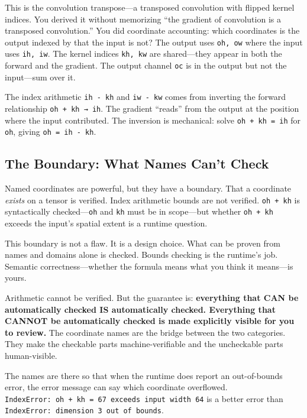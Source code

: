 \documentclass[11pt,titlepage]{article}
\begin{document}
This is the convolution transpose---a transposed convolution with
flipped kernel indices. You derived it without memorizing ``the gradient
of convolution is a transposed convolution.'' You did coordinate
accounting: which coordinates is the output indexed by that the input is
not? The output uses \texttt{oh,\ ow} where the input uses
\texttt{ih,\ iw}. The kernel indices \texttt{kh,\ kw} are shared---they
appear in both the forward and the gradient. The output channel
\texttt{oc} is in the output but not the input---sum over it.

The index arithmetic \texttt{ih\ -\ kh} and \texttt{iw\ -\ kw} comes
from inverting the forward relationship \texttt{oh\ +\ kh\ →\ ih}. The
gradient ``reads'' from the output at the position where the input
contributed. The inversion is mechanical: solve
\texttt{oh\ +\ kh\ =\ ih} for \texttt{oh}, giving
\texttt{oh\ =\ ih\ -\ kh}.

\vspace{2em}

\hypertarget{the-boundary-what-names-cant-check}{%
\subsection{The Boundary: What Names Can't
Check}\label{the-boundary-what-names-cant-check}}

Named coordinates are powerful, but they have a boundary. That a
coordinate \emph{exists} on a tensor is verified. Index arithmetic
bounds are not verified. \texttt{oh\ +\ kh} is syntactically
checked---\texttt{oh} and \texttt{kh} must be in scope---but whether
\texttt{oh\ +\ kh} exceeds the input's spatial extent is a runtime
question.

This boundary is not a flaw. It is a design choice. What can be proven
from names and domains alone is checked. Bounds checking is the
runtime's job. Semantic correctness---whether the formula means what you
think it means---is yours.

Arithmetic cannot be verified. But the guarantee is: \textbf{everything
that CAN be automatically checked IS automatically checked. Everything
that CANNOT be automatically checked is made explicitly visible for you
to review.} The coordinate names are the bridge between the two
categories. They make the checkable parts machine-verifiable and the
uncheckable parts human-visible.

The names are there so that when the runtime does report an
out-of-bounds error, the error message can say which coordinate
overflowed.
\texttt{IndexError:\ oh\ +\ kh\ =\ 67\ exceeds\ input\ width\ 64} is a
better error than \texttt{IndexError:\ dimension\ 3\ out\ of\ bounds}.
\end{document}
